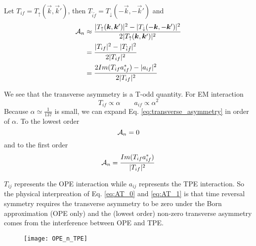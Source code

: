 Let $T_{if} = T_{\uparrow}(\vec{k}, \vec{k}')$, then $T_{\tilde{i}\tilde{f}} = T_\downarrow (-\vec{k}, -\vec{k}')$
and
\begin{equation}
    \begin{aligned}
	\mathcal{A}_n &\approx \frac{|T_{\uparrow}(\boldsymbol{k}, \boldsymbol{k}')|^2 - |T_{\downarrow}(-\boldsymbol{k}, -\boldsymbol{k}')|^2}{2|T_{\uparrow}(\boldsymbol{k}, \boldsymbol{k}')|^2} \\
	    &= \frac{|T_{if}|^2 - |T_{\tilde{i}\tilde{f}}|^2}{2|T_{if}|^2}  \\
	    &= \frac{2Im(T_{if}a^*_{if}) - |a_{if}|^2}{2|T_{if}|^2}
    \end{aligned}
    \label{eq:transverse_asymmetry}
\end{equation}

We see that the transverse asymmetry is a T-odd quantity. For EM interaction
\begin{equation}
    T_{if} \propto \alpha \qquad a_{if} \propto \alpha^2
\end{equation}
Because $\alpha \simeq \frac{1}{137}$ is small, we can expand Eq. \ref{eq:transverse_asymmetry} 
in order of $\alpha$. To the lowest order
\begin{equation}
    \mathcal{A}_n = 0
    \label{eq:AT_0}
\end{equation}
and to the first order 
\begin{equation}
    \mathcal{A}_n = \frac{Im(T_{if}a^*_{if})}{|T_{if}|^2}
    \label{eq:AT_1}
\end{equation}

$T_{ij}$ represents the OPE interaction while $a_{ij}$ represents
the TPE interaction. So the physical interpreation of
Eq. \ref{eq:AT_0} and \ref{eq:AT_1} is that time reversal symmetry requires 
the transverse asymmetry to be zero under the Born approximation (OPE only)
and the (lowest order) non-zero transverse asymmetry comes from the interference 
between OPE and TPE.
\begin{figure}[h!]
    \centering
    \texttt{[image: OPE\_n\_TPE]}
\end{figure}

